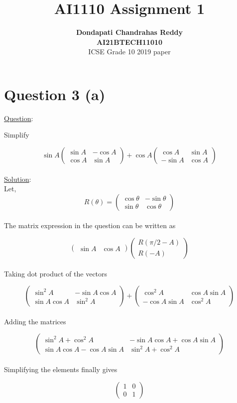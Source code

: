 \documentclass[journal,12pt,twocolumn]{IEEEtran}
\newcommand{\myvec}[1]{\ensuremath{\begin{pmatrix}#1\end{pmatrix}}}
\begin{document}
\title{\textbf{AI1110 Assignment 1} }
\author{\textbf{Dondapati Chandrahas Reddy}\\ \textbf{AI21BTECH11010}\\ ICSE Grade 10 2019 paper}

\maketitle

{\section {Question 3 (a) \newline}}

{\large \underline{Question}:\newline}

Simplify

\begin{equation*}
	\sin A\myvec{\sin A &  -\cos A \\ \cos A & \sin A} + \cos A \myvec{\cos A &  \sin A \\ -\sin A & \cos A}
\end{equation*}\\

{\large \underline{Solution}:}\\

Let,
\begin{equation*}
	R(\theta) = \myvec{\cos \theta &  -\sin \theta \\ \sin \theta & \cos \theta}
\end{equation*}\\

The matrix expression in the question can be written as

\begin{equation*}
	\myvec{\sin A & \cos A} \myvec{R(\pi/2 - A) \\ R( -A)}
\end{equation*}\\

Taking dot product of the vectors

\begin{equation*}
	\myvec{\sin^2 A &  -\sin A\cos A \\ \sin A\cos A & \sin^2 A} +\myvec{\cos^2 A & \cos A\sin A \\ -\cos A\sin A & \cos^2 A}
\end{equation*}\\

Adding the matrices

\begin{equation*}
	\myvec{\sin^2 A + \cos^2 A &  -\sin A \cos A +\cos A \sin A \\ \sin A \cos A -\cos A \sin A & \sin^2 A + \cos^2 A}
\end{equation*}\\

Simplifying the elements finally gives

\begin{equation*}
	\myvec{1 & 0 \\ 0 & 1}
\end{equation*}\\
\end{document}
